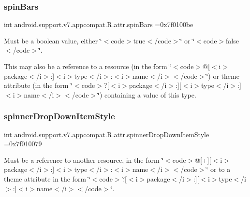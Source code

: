 \subsubsection{\texorpdfstring{spin\+Bars}{spinBars}}
{\footnotesize\ttfamily int android.\+support.\+v7.\+appcompat.\+R.\+attr.\+spin\+Bars =0x7f0100be\hspace{0.3cm}{\ttfamily [static]}}

Must be a boolean value, either \char`\"{}$<$code$>$true$<$/code$>$\char`\"{} or \char`\"{}$<$code$>$false$<$/code$>$\char`\"{}. 

This may also be a reference to a resource (in the form \char`\"{}$<$code$>$@\mbox{[}$<$i$>$package$<$/i$>$\+:\mbox{]}$<$i$>$type$<$/i$>$\+:$<$i$>$name$<$/i$>$$<$/code$>$\char`\"{}) or theme attribute (in the form \char`\"{}$<$code$>$?\mbox{[}$<$i$>$package$<$/i$>$\+:\mbox{]}\mbox{[}$<$i$>$type$<$/i$>$\+:\mbox{]}$<$i$>$name$<$/i$>$$<$/code$>$\char`\"{}) containing a value of this type. \mbox{\label{classandroid_1_1support_1_1v7_1_1appcompat_1_1R_1_1attr_a07e24b4eab5f4981771950f48a1ebcf0}} 
\subsubsection{\texorpdfstring{spinner\+Drop\+Down\+Item\+Style}{spinnerDropDownItemStyle}}
{\footnotesize\ttfamily int android.\+support.\+v7.\+appcompat.\+R.\+attr.\+spinner\+Drop\+Down\+Item\+Style =0x7f010079\hspace{0.3cm}{\ttfamily [static]}}

Must be a reference to another resource, in the form \char`\"{}$<$code$>$@\mbox{[}+\mbox{]}\mbox{[}$<$i$>$package$<$/i$>$\+:\mbox{]}$<$i$>$type$<$/i$>$\+:$<$i$>$name$<$/i$>$$<$/code$>$\char`\"{} or to a theme attribute in the form \char`\"{}$<$code$>$?\mbox{[}$<$i$>$package$<$/i$>$\+:\mbox{]}\mbox{[}$<$i$>$type$<$/i$>$\+:\mbox{]}$<$i$>$name$<$/i$>$$<$/code$>$\char`\"{}. \mbox{\label{classandroid_1_1support_1_1v7_1_1appcompat_1_1R_1_1attr_a756d2c11dcb65821e13f93739bb74526}} 

